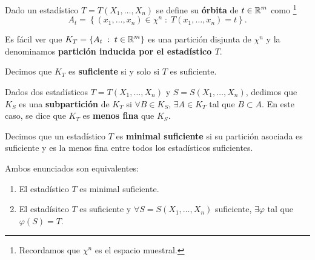 \begin{definition}[Órbita]
Dado un estadístico $\displaystyle T = T\left(X_{1}, \ldots, X_{n}\right) $ se define su \textbf{órbita} de $\displaystyle t \in \mathbb{R}^{m} $ como \footnote{Recordamos que $\displaystyle \chi^{n} $ es el espacio muestral.} 
\[A_{t}= \left\{ \left(x_{1}, \ldots, x_{n}\right) \in \chi^{n} \; : \; T\left(x_{1}, \ldots, x_{n}\right)=t\right\}  .\]
\end{definition}
\begin{observation}
	Es fácil ver que $\displaystyle K_{T}= \left\{ A_{t} \; : \; t \in \mathbb{R}^{m}\right\}  $ es una partición disjunta de $\displaystyle \chi^{n} $ y la denominamos \textbf{partición inducida por el estadístico $\displaystyle T $}.
\end{observation}
\begin{notation}
Decimos que $\displaystyle K_{T} $ es \textbf{suficiente} si y solo si $\displaystyle T $ es suficiente.
\end{notation}
\begin{definition}[Subpartición]
Dados dos estadísticos $\displaystyle T = T\left(X_{1}, \ldots, X_{n}\right) $ y $\displaystyle S = S\left(X_{1}, \ldots, X_{n}\right) $, dedimos que $\displaystyle K_{S} $ es una \textbf{subpartición} de $\displaystyle K_{T} $ si $\displaystyle \forall B \in K_{S} $, $\displaystyle \exists A \in K_{T} $ tal que $\displaystyle B \subset A $. En este caso, se dice que $\displaystyle K_{T} $ es \textbf{menos fina} que $\displaystyle K_{S} $. 
\end{definition}
\begin{definition}
Decimos que un estadístico $\displaystyle T $ es \textbf{minimal suficiente} si su partición asociada es suficiente y es la menos fina entre todos los estadísticos suficientes.
\end{definition}
\begin{prop}
Ambos enunciados son equivalentes:
\begin{enumerate}
\item El estadístico $\displaystyle T $ es minimal suficiente.
\item El estadísitco $\displaystyle T $ es suficiente y $\displaystyle \forall S = S\left(X_{1}, \ldots, X_{n}\right) $ suficiente, $\displaystyle \exists \varphi $ tal que $\displaystyle \varphi\left(S\right)=T $. 
\end{enumerate}
\end{prop}
